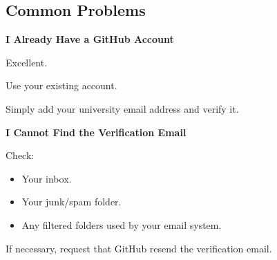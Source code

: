 \documentclass{csc2059practical}
\begin{document}
\subsection{Common Problems}
\begin{commonerror}
\textbf{I Already Have a GitHub Account}\par
\medskip

Excellent.


Use your existing account.


Simply add your university email address and verify it.


\end{commonerror}
\begin{commonerror}
\textbf{I Cannot Find the Verification Email}\par
\medskip

Check:


\end{commonerror}
\begin{itemize}
  \item Your inbox.
  \item Your junk/spam folder.
  \item Any filtered folders used by your email system.
\end{itemize}
If necessary, request that GitHub resend the verification email.
\end{document}

